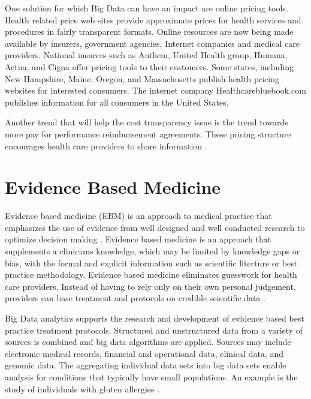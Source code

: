 \documentclass[sigconf]{acmart}
\begin{document}
One solution for which Big Data can have an impact are online pricing tools.  Health related price web sites provide approximate prices for health services and procedures in fairly transparent formats. Online resources are now being made available by insurers, government agencies, Internet companies and medical care providers. National insurers such as Anthem, United Health group, Humana, Aetna, and Cigna offer pricing tools to their customers. Some states, including New Hampshire, Maine, Oregon, and Massachusetts publish health pricing websites for interested consumers. The internet company Healthcarebluebook.com publishes information for all consumers in the United States.  

Another trend that will help the cost transparency issue is the trend towards more pay for performance reimbursement agreements. These pricing structure encourages health care providers to share information \cite{www-google-christian}. 

\section{Evidence Based Medicine}

Evidence based medicine (EBM) is an approach to medical practice that emphasizes the use of evidence from well designed and well conducted research to optimize decision making \cite{www-google-wikievi}.  Evidence based medicine is an approach that supplements a clinicians knowledge, which may be limited by knowledge gaps or bias, with the formal and explicit information such as scientific literture or best practice methodology. Evidence based medicine eliminates guesswork for health care providers. Instead of having to rely only on their own personal judgement, providers can base treatment and protocols on credible scientific data \cite{www-google-christian}.

Big Data analytics supports the research and development of evidence based best practice treatment protocols.  Structured and unstructured data from a variety of sources is combined and big data algorithms are applied. Sources may include electronic medical records, financial and operational data, clinical data, and genomic data. The aggregating individual data sets into big data sets  enable analysis for conditions that typically have small populations.  An example is the study of individuals with gluten allergies \cite{www-google-McKinsey}.
 
\end{document}
